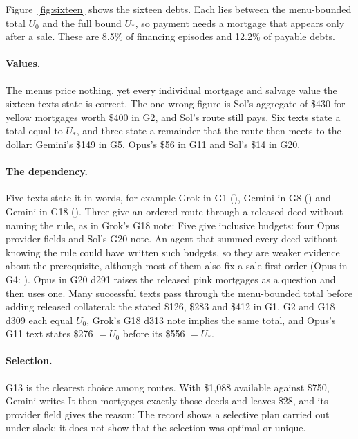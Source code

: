 \documentclass[10pt,twocolumn,letterpaper]{article}
\begin{document}
Figure~\ref{fig:sixteen} shows the sixteen debts. Each lies between the menu-bounded total $U_0$ and the full bound $U_*$, so payment needs a mortgage that appears only after a sale. These are 8.5\% of financing episodes and 12.2\% of payable debts.

\paragraph{Values.} The menus price nothing, yet every individual mortgage and salvage value the sixteen texts state is correct. The one wrong figure is Sol's aggregate of \$430 for yellow mortgages worth \$400 in G2, and Sol's route still pays. Six texts state a total equal to $U_*$, and three state a remainder that the route then meets to the dollar: Gemini's \$149 in G5, Opus's \$56 in G11 and Sol's \$14 in G20.

\paragraph{The dependency.} Five texts state it in words, for example Grok in G1 (), Gemini in G8 () and Gemini in G18 (). Three give an ordered route through a released deed without naming the rule, as in Grok's G18 note:  Five give inclusive budgets: four Opus provider fields and Sol's G20 note. An agent that summed every deed without knowing the rule could have written such budgets, so they are weaker evidence about the prerequisite, although most of them also fix a sale-first order (Opus in G4: ). Opus in G20 d291 raises the released pink mortgages as a question and then uses one. Many successful texts pass through the menu-bounded total before adding released collateral: the stated \$126, \$283 and \$412 in G1, G2 and G18 d309 each equal $U_0$, Grok's G18 d313 note implies the same total, and Opus's G11 text states \$276 $=U_0$ before its \$556 $=U_*$.

\paragraph{Selection.} G13 is the clearest choice among routes. With \$1,088 available against \$750, Gemini writes  It then mortgages exactly those deeds and leaves \$28, and its provider field gives the reason:  The record shows a selective plan carried out under slack; it does not show that the selection was optimal or unique.
\end{document}

